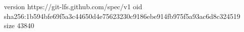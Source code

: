version https://git-lfs.github.com/spec/v1
oid sha256:1b594bfe69f5a3c44650d4e75623230c9186ebe914fb975f5a93ac6d8c324519
size 43840
